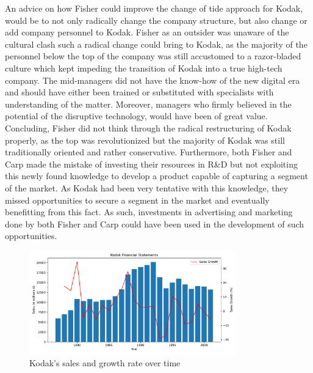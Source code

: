 \documentclass[a4paper,10pt,UTF8]{scrartcl}
\begin{document}
An advice on how Fisher could improve the change of tide approach for Kodak, would be to not only radically change the company structure, but also change or add company personnel to Kodak. Fisher as an outsider was unaware of the cultural clash such a radical change could bring to Kodak, as the majority of the personnel below the top of the company was still accustomed to a razor-bladed culture which kept impeding the transition of Kodak into a true high-tech company. The mid-managers did not have the know-how of the new digital era and should have either been trained or substituted with specialists with understanding of the matter. Moreover, managers who firmly believed in the potential of the disruptive technology, would have been of great value. Concluding, Fisher did not think through the radical restructuring of Kodak properly, as the top was revolutionized but the majority of Kodak was still traditionally oriented and rather conservative. Furthermore, both Fisher and Carp made the mistake of investing their resources in R\&D but not exploiting this newly found knowledge to develop a product capable of capturing a segment of the market. As Kodak had been very tentative with this knowledge, they missed opportunities to secure a segment in the market and eventually benefitting from this fact. As such, investments in advertising and marketing done by both Fisher and Carp could have been used in the development of such opportunities. 

\begin{figure}[htbp]
    \centering
    \includegraphics[width=0.8\textwidth]{Sales.pdf}
    \caption{Kodak's sales and growth rate over time}
    \label{fig:3}
\end{figure}









% 
% 
\end{document}
